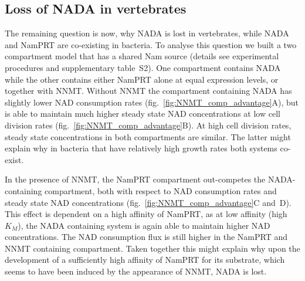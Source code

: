 \subsection{Loss of NADA in vertebrates}

The remaining question is now, why NADA is lost in vertebrates, while NADA and NamPRT are co-existing in bacteria. To analyse this question we built a two compartment model that has a shared Nam source (details see experimental procedures and supplementary table~S2). One compartment contains NADA while the other contains either NamPRT alone at equal expression levels, or together with NNMT. Without NNMT the compartment containing NADA has slightly lower NAD consumption rates (fig.~\ref{fig:NNMT_comp_advantage}A), but is able to maintain much higher steady state NAD concentrations at low cell division rates (fig.~\ref{fig:NNMT_comp_advantage}B). At high cell division rates, steady state concentrations in both compartments are similar. The latter might explain why in bacteria that have relatively high growth rates both systems co-exist.

In the presence of NNMT, the NamPRT compartment out-competes the NADA-containing compartment, both with respect to NAD consumption rates and steady state NAD concentrations (fig.~\ref{fig:NNMT_comp_advantage}C and~D). This effect is dependent on a high affinity of NamPRT, as at low affinity (high $K_{M}$), the NADA containing system is again able to maintain higher NAD concentrations. The NAD consumption flux is still higher in the NamPRT and NNMT containing compartment. Taken together this might explain why upon the development of a sufficiently high affinity of NamPRT for its substrate, which seems to have been induced by the appearance of NNMT, NADA is lost.

